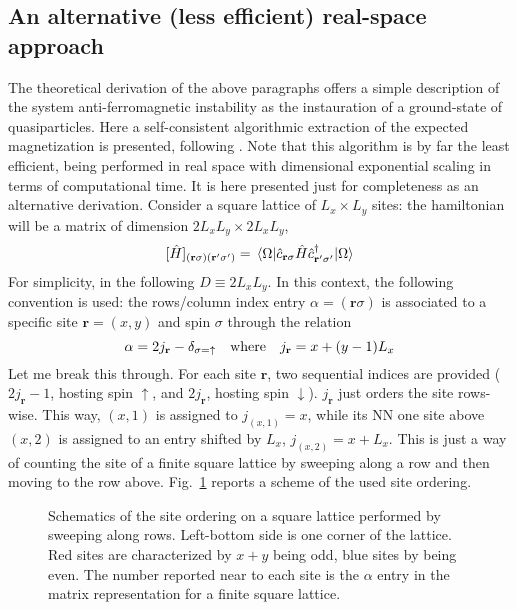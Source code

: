 \subsection{An alternative (less efficient) real-space approach}

The theoretical derivation of the above paragraphs offers a simple description of the system anti-ferromagnetic instability as the instauration of a ground-state of quasiparticles. Here a self-consistent algorithmic extraction of the expected magnetization is presented, following \cite{scholle2023comprehensive}. Note that this algorithm is by far the least efficient, being performed in real space with dimensional exponential scaling in terms of computational time. It is here presented just for completeness as an alternative derivation. Consider a square lattice of $L_x \times L_y$ sites: the hamiltonian will be a matrix of dimension $2L_x L_y \times 2L_x L_y$,
\[
	[ \hat H ]_{(\mathbf{r}\sigma)(\mathbf{r}'\sigma')} = \mel{\Omega}{ \hat c_{\mathbf{r}\sigma} \hat H \hat c_{\mathbf{r}'\sigma'}^\dagger}{\Omega}
\]
For simplicity, in the following $D \equiv 2L_x L_y$. In this context, the following convention is used: the rows/column index entry $\alpha=(\mathbf{r}\sigma)$ is associated to a specific site $\mathbf{r}=(x,y)$ and spin $\sigma$ through the relation
\[
	\alpha = 2j_\mathbf{r}-\delta_{\sigma=\uparrow}
	\qq{where}
	j_\mathbf{r} = x+(y-1)L_x 
\]
Let me break this through. For each site $\mathbf{r}$, two sequential indices are provided ($2j_\mathbf{r}-1$, hosting spin $\uparrow$, and $2j_\mathbf{r}$, hosting spin $\downarrow$). $j_\mathbf{r}$ just orders the site rows-wise. This way, $(x,1)$ is assigned to $j_{(x,1)}=x$, while its NN one site above $(x,2)$ is assigned to an entry shifted by $L_x$, $j_{(x,2)}=x+L_x$. This is just a way of counting the site of a finite square lattice by sweeping along a row and then moving to the row above. Fig.~\ref{appfig:square-lattice-ordering} reports a scheme of the used site ordering.

\begin{figure}
	\centering
%	
	\caption{Schematics of the site ordering on a square lattice performed by sweeping along rows. Left-bottom side is one corner of the lattice. Red sites are characterized by $x+y$ being odd, blue sites by being even. The number reported near to each site is the $\alpha$ entry in the matrix representation for a finite square lattice.}
	\label{appfig:square-lattice-ordering}
\end{figure}

